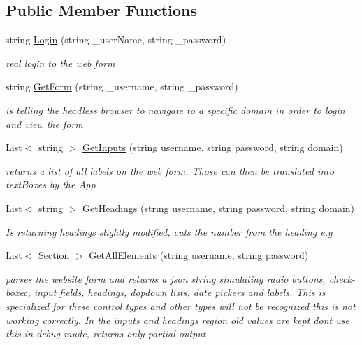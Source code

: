 \subsection*{Public Member Functions}
\begin{DoxyCompactItemize}
\item 
string \hyperlink{class_wcf_service1_1_1_service1_a451391230a00d5f6ea6aafd54aad1a12}{Login} (string \+\_\+user\+Name, string \+\_\+password)
\begin{DoxyCompactList}\small\item\em real login to the web form \end{DoxyCompactList}\item 
string \hyperlink{class_wcf_service1_1_1_service1_a13eccecdb2a4a36fbbbd96f2ff07f880}{Get\+Form} (string \+\_\+username, string \+\_\+password)
\begin{DoxyCompactList}\small\item\em is telling the headless browser to navigate to a specific domain in order to login and view the form \end{DoxyCompactList}\item 
List$<$ string $>$ \hyperlink{class_wcf_service1_1_1_service1_ad9115f054786f723b3bcb4f3f62457ba}{Get\+Inputs} (string username, string password, string domain)
\begin{DoxyCompactList}\small\item\em returns a list of all labels on the web form. Those can then be translated into text\+Boxes by the App \end{DoxyCompactList}\item 
List$<$ string $>$ \hyperlink{class_wcf_service1_1_1_service1_a9a93a18651e7fd879d8166bd70abdbfe}{Get\+Headings} (string username, string password, string domain)
\begin{DoxyCompactList}\small\item\em Is returning headings slightly modified, cuts the number from the heading e.\+g \end{DoxyCompactList}\item 
List$<$ Section $>$ \hyperlink{class_wcf_service1_1_1_service1_ab19a2f842aca61072732f113e7278ba6}{Get\+All\+Elements} (string username, string password)
\begin{DoxyCompactList}\small\item\em parses the website form and returns a json string simulating radio buttons, check-\/boxec, input fields, headings, dopdown lists, date pickers and labels. This is specialized for these control types and other types will not be recognized this is not working correctly. In the inputs and headings region old values are kept don\textquotesingle{}t use this in debug mude, returns only partial output \end{DoxyCompactList}\item 

\end{DoxyCompactItemize}
